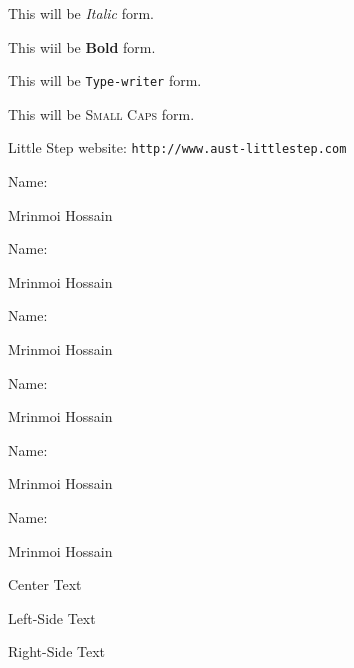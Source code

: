\documentclass[11pt]{article}
\begin{document}
This will be \textit{Italic} form.

This wiil be \textbf{Bold} form.

This will be \texttt{Type-writer} form.

This will be \textsc{Small Caps} form.

Little Step website: \texttt{http://www.aust-littlestep.com}

Name: \begin{tiny}Mrinmoi Hossain\end{tiny}

Name: \begin{small}Mrinmoi Hossain\end{small}

Name: \begin{large}Mrinmoi Hossain\end{large}

Name: \begin{Large}Mrinmoi Hossain\end{Large}

Name: \begin{huge}Mrinmoi Hossain\end{huge}

Name: \begin{Huge}Mrinmoi Hossain\end{Huge}

\begin{center}Center Text\end{center}

\begin{flushleft}Left-Side Text\end{flushleft}

\begin{flushright}Right-Side Text\end{flushright}
\end{document}

